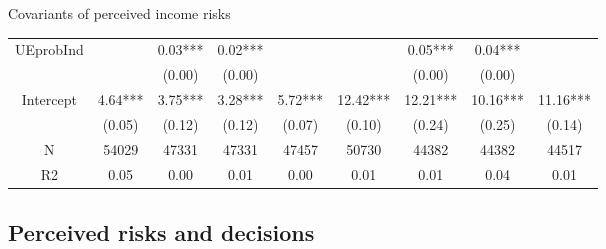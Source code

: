 \documentclass{beamer}
\begin{document}
\begin{frame}{Covariants of perceived income risks}
\begin{table}
{\begin{tabular}{ccccccccc}
	UEprobInd        &          &   0.03*** &    0.02*** &             &           &    0.05*** &     0.04*** &              \\
	&          &    (0.00) &     (0.00) &             &           &     (0.00) &      (0.00) &              \\
	Intercept        &  4.64*** &   3.75*** &    3.28*** &     5.72*** &  12.42*** &   12.21*** &    10.16*** &     11.16*** \\
	&   (0.05) &    (0.12) &     (0.12) &      (0.07) &    (0.10) &     (0.24) &      (0.25) &       (0.14) \\
	\hline 
	N                &    54029 &     47331 &      47331 &       47457 &     50730 &      44382 &       44382 &        44517 \\
	R2               &     0.05 &      0.00 &       0.01 &        0.00 &      0.01 &       0.01 &        0.04 &         0.01 \\
	\hline 
\end{tabular}
}
	\end{table}
\end{frame}


\subsection{Perceived risks and decisions}
\end{document}
